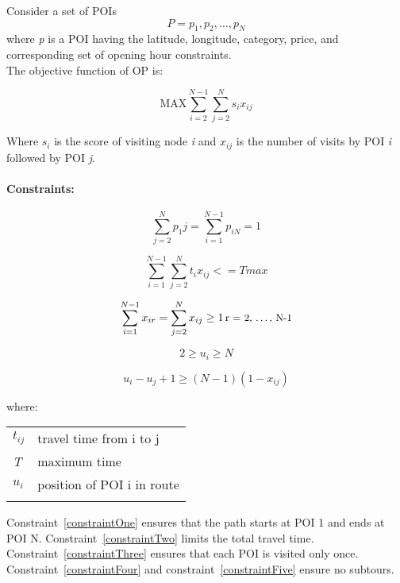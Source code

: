 \setlength{\tabcolsep}{20pt}

Consider a set of POIs \[P = {p_1,p_2,\ldots,p_N}\]
where \textit{p} is a POI having the latitude, longitude, category,
price, and corresponding set of opening hour constraints.
\\
The objective function of OP is:

\[ \text{MAX}  \sum_{i=2}^{N-1} \sum_{j=2}^{N} {s_i}{x_{ij}} \]

\noindent Where \textit{$s_i$} is the score of visiting node \textit{i} and
\textit{$x_{ij}$} is the number of visits by POI \textit{i} followed by POI \textit{j}.

\noindent \paragraph{Constraints:} 

\begin{multicols}{2}
\begin{equation} 
    \label{constraintOne}
    \sum_{j=2}^{N} p_1j = \sum_{i=1}^{N-1} p_{iN}= 1
\end{equation}

\begin{equation} 
    \label{constraintTwo}
    \sum_{i=1}^{N-1} \sum_{j=2}^{N} t_{i}x_{ij}<= Tmax
\end{equation}


\end{multicols}


\begin{equation} 
    \label{constraintThree}
    \sum_{i=1}^{N-1} x_{ir} = \sum_{j=2}^{N} x_{ij} \geq 1 \, \text{\small{r = 2, \ldots, N-1}}
\end{equation}

\begin{equation} 
    \label{constraintFour}
    2 \geq u_i \geq N 
\end{equation}

\begin{equation} 
    \label{constraintFive}
    u_i - u_j + 1 \geq (N-1)(1-x_{ij})
\end{equation}

where:

\begin{tabular}{l l}
\textit{$t_{ij}$} & travel time from i to j \\
\textit{T} & maximum time \\
\textit{$u_i$} & position of POI i in route\\

               & \\

\end{tabular}


Constraint~\ref{constraintOne} ensures that the path starts at POI 1 and ends at POI N.
Constraint~\ref{constraintTwo} limits the total travel time.
Constraint~\ref{constraintThree} ensures that each POI is visited only once.
Constraint~\ref{constraintFour} and constraint~\ref{constraintFive} ensure no subtours.
\\

